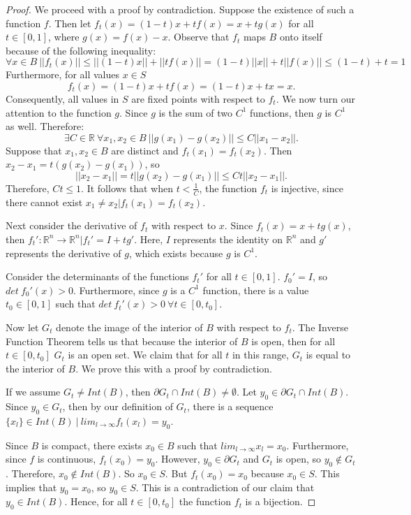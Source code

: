 \documentclass[12pt]{article}
\theoremstyle{definition}
\theoremstyle{remark}
\begin{document}
\begin{proof}
We proceed with a proof by contradiction. Suppose the existence of such a function $f$. Then let $f_t(x) = (1-t)x + tf(x) = x + tg(x)$ for all $t \in [0,1]$, where $g(x) = f(x) - x$. Observe that $f_t$ maps $B$ onto itself because of the following inequality:
\[
	\forall x \in B\ ||f_t(x)|| \leq ||(1-t)x|| + ||tf(x)|| = (1-t)||x|| + t||f(x)|| \leq (1-t) + t = 1
\]
Furthermore, for all values $x \in S$
\[
	f_t(x) = (1-t)x + tf(x) = (1-t)x + tx = x.
\]
Consequently, all values in $S$ are fixed points with respect to $f_t$. We now turn our attention to the function $g$. Since $g$ is the sum of two $C^1$ functions, then $g$ is $C^1$ as well. Therefore:
\[
	\exists C \in \mathbb{R}\ \forall x_1,x_2 \in B\ ||g(x_1) - g(x_2)|| \leq C||x_1 - x_2||.
\]
Suppose that $x_1,x_2 \in B$ are distinct and $f_t(x_1) = f_t(x_2)$. Then $x_2 - x_1 = t(g(x_2)-g(x_1))$, so
\[
	||x_2 - x_1|| = t||g(x_2) - g(x_1)|| \leq Ct||x_2 - x_1||.
\]
Therefore, $Ct \leq 1$. It follows that when $t < \frac{1}{C}$, the function $f_t$ is injective, since there cannot exist $x_1 \neq x_2 | f_t(x_1) = f_t(x_2)$.

Next consider the derivative of $f_t$ with respect to $x$. Since $f_t(x) = x + tg(x)$, then $f_t': \mathbb{R}^n \rightarrow \mathbb{R}^n | f_t' = I + tg'$. Here, $I$ represents the identity on $\mathbb{R}^n$ and $g'$ represents the derivative of $g$, which exists because $g$ is $C^1$.

Consider the determinants of the functions $f_t'$ for all $t \in [0,1]$. $f_0' = I$, so $det\ f_0'(x) > 0$. Furthermore, since $g$ is a $C^1$ function, there is a value $t_0 \in [0,1]$ such that $det\ f_t'(x) > 0\ \forall t \in [0,t_0]$.

Now let $G_t$ denote the image of the interior of $B$ with respect to $f_t$. The Inverse Function Theorem tells us that because the interior of $B$ is open, then for all $t \in [0,t_0]$ $G_t$ is an open set. We claim that for all $t$ in this range, $G_t$ is equal to the interior of $B$. We prove this with a proof by contradiction.

If we assume $G_t \neq Int(B)$, then $\partial G_t \cap Int(B) \neq \emptyset$. Let $y_0 \in \partial G_t \cap Int(B)$. Since $y_0 \in G_t$, then by our definition of $G_t$, there is a sequence $\{x_l\} \in Int(B)\ |\ lim_{l \rightarrow \infty} f_t(x_l) = y_0$.

Since $B$ is compact, there exists $x_0 \in B$ such that $lim_{l \rightarrow \infty}x_l = x_0$. Furthermore, since $f$ is continuous, $f_t(x_0) = y_0$. However, $y_0 \in \partial G_t$ and $G_t$ is open, so $y_0 \notin G_t$. Therefore, $x_0 \notin Int(B)$. So $x_0 \in S$. But $f_t(x_0) = x_0$ because $x_0 \in S$. This implies
that $y_0 = x_0$, so $y_0 \in S$. This is a contradiction of our claim that $y_0 \in Int(B)$. Hence, for all $t \in [0,t_0]$ the function $f_t$ is a bijection.


\end{proof}
\end{document}
